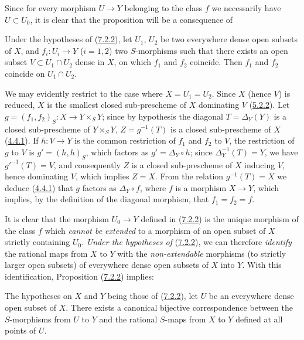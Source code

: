 Since for every morphism $U\to Y$ belonging to the class $f$ we necessarily
have $U\subset U_0$, it is clear that the proposition will be a consequence
of

\begin{lemma}[7.2.2.1]
\label{I.7.2.2.1}
Under the hypotheses of \textup{(\hyperref[I.7.2.2]{7.2.2})}, let $U_1$, $U_2$ be
two everywhere dense open subsets of $X$, and $f_i:U_i\to Y$ ($i=1,2$) two
$S$-morphisms such that there exists an open subset $V\subset U_1\cap U_2$ dense
in $X$, on which $f_1$ and $f_2$ coincide. Then $f_1$ and $f_2$ coincide on
$U_1\cap U_2$.
\end{lemma}

We may evidently restrict to the case where $X=U_1=U_2$. Since $X$ (hence
$V$) is reduced, $X$ is the smallest closed sub-prescheme of $X$ dominating $V$
(\hyperref[I.5.2.2]{5.2.2}). Let
$g=(f_1,f_2)_S:X\to Y\times_S Y$; since by hypothesis the diagonal
$T=\Delta_Y(Y)$ is a closed sub-prescheme of $Y\times_S Y$,
$Z=g^{-1}(T)$ is a closed sub-prescheme of $X$
(\hyperref[I.4.4.1]{4.4.1}). If $h:V\to Y$ is the common restriction of
$f_1$ and $f_2$ to $V$, the restriction of $g$ to $V$ is $g'=(h,h)_S$, which
factors as $g'=\Delta_Y\circ h$; since $\Delta_Y^{-1}(T)=Y$, we have
$g'^{-1}(T)=V$, and consequently $Z$ is a closed sub-prescheme of $X$ inducing
$V$, hence dominating $V$, which implies $Z=X$. From the relation
$g^{-1}(T)=X$ we deduce (\hyperref[I.4.4.1]{4.4.1}) that $g$ factors as
$\Delta_Y\circ f$, where $f$ is a morphism $X\to Y$, which implies, by the
definition of the diagonal morphism, that $f_1=f_2=f$.

It is clear that the morphism $U_0\to Y$ defined in
(\hyperref[I.7.2.2]{7.2.2}) is the unique morphism of the class $f$ which
\emph{cannot be extended} to a morphism of an open subset of $X$ strictly
containing $U_0$. \emph{Under the hypotheses of}
(\hyperref[I.7.2.2]{7.2.2}), we can therefore \emph{identify} the
rational maps from $X$ to $Y$ with the \emph{non-extendable} morphisms (to
strictly larger open subsets) of everywhere dense open subsets of $X$ into $Y$.
With this identification, Proposition
(\hyperref[I.7.2.2]{7.2.2}) implies:

\begin{corollary}[7.2.3]
\label{I.7.2.3}
The hypotheses on $X$ and $Y$ being those of
\textup{(\hyperref[I.7.2.2]{7.2.2})}, let $U$ be an everywhere dense open subset of
$X$. There exists a canonical bijective correspondence between the
$S$-morphisms from $U$ to $Y$ and the rational $S$-maps from $X$ to $Y$
defined at all points of $U$.
\end{corollary}

